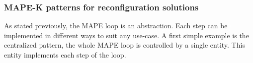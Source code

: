 \documentclass{article}
\begin{document}


\subsubsection{MAPE-K patterns for reconfiguration solutions}
As stated previously, the MAPE loop is an abstraction. Each step can be implemented in different ways to suit any use-case. A first simple example is the centralized pattern, the whole MAPE loop is controlled by a single entity. This entity implements each step of the loop.




\end{document}
